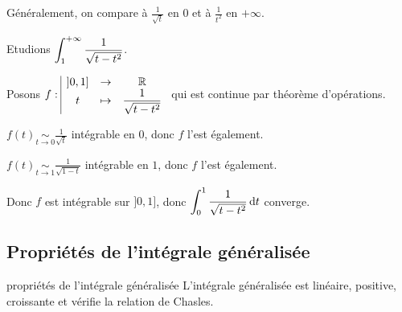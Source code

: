 \begin{remarque}
    Généralement, on compare à $\frac 1 {\sqrt t}$ en $0$ et à $\frac 1 {t^2}$ en $+ \infty$.
\end{remarque}

\begin{exemple}
    Etudions $\displaystyle \int_{1 }^{+\infty} \frac 1 { \sqrt{t - t^2}}$. 

    Posons $f: \space \begin{array}{|ccc} \displaystyle ]0, 1] & \to & \displaystyle \mathbb{R} \\ \displaystyle t & \mapsto & \displaystyle \frac{1}{\sqrt{t - t^2}} \end{array}$ qui est continue par théorème d'opérations.


    \svspace $f(t) \underset{t \to 0 }{ \sim } \frac 1 {\sqrt t}$ intégrable en $0$, donc $f$ l'est également. 
    

    \svspace $f(t) \underset{t \to 1 }{ \sim } \frac 1 {\sqrt{1 - t}}$ intégrable en $1$, donc $f$ l'est également.

    \avspace Donc $f$ est intégrable sur $]0, 1]$, donc $\displaystyle \int_{0}^{1 } \frac{1}{\sqrt{t - t^2}} \,\mathrm{d}t$ converge.
\end{exemple}

\subsection{Propriétés de l'intégrale généralisée }

\begin{proposition}{propriétés de l'intégrale généralisée}{}
    L'intégrale généralisée est linéaire, positive, croissante et vérifie la relation 
    de Chasles. 
\end{proposition}

